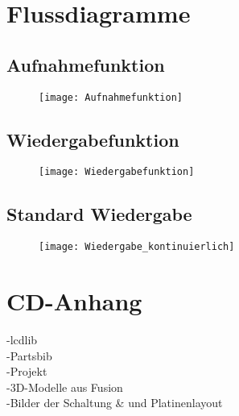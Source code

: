 
\newpage
\appendix
\section{Flussdiagramme}
\subsection{Aufnahmefunktion}
\label{fluss:recf}
\begin{figure}[h]
	\begin{center}
		\texttt{[image: Aufnahmefunktion]}
	\end{center}
\end{figure}
\newpage
\subsection{Wiedergabefunktion}
\label{fluss:playf}
\begin{figure}[h]
	\begin{center}
		\texttt{[image: Wiedergabefunktion]}
	\end{center}
\end{figure}
\newpage
\subsection{Standard Wiedergabe}
\label{fluss:playconti}
\begin{figure}[h]
	\begin{center}
		\texttt{[image: Wiedergabe\_kontinuierlich]}
	\end{center}
\end{figure}
\newpage
\section{CD-Anhang}
\label{CD-Anhang}
-lcdlib\\
-Partsbib\\
-Projekt\\
-3D-Modelle aus Fusion\\
-Bilder der Schaltung \& und Platinenlayout\\